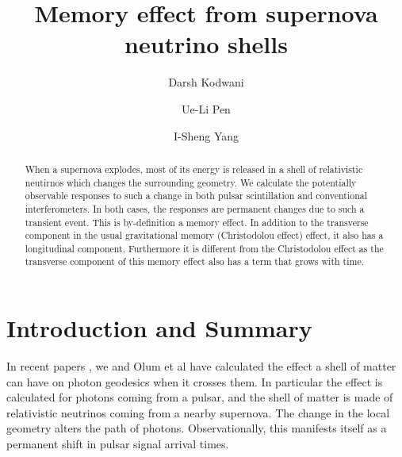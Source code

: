 \documentclass[aps,showpacs,onecolumn,floats,prd,superscriptaddress,nofootinbib]{revtex4-1}
\begin{document}
\title{Memory effect from supernova neutrino shells}

\author{Darsh Kodwani}

\author{Ue-Li Pen}

\author{I-Sheng Yang}

\begin{abstract}
When a supernova explodes, most of its energy is released in a shell of relativistic neutirnos which changes the surrounding geometry.
We calculate the potentially observable responses to such a change in both pulsar scintillation and conventional interferometers.
In both cases, the responses are permanent changes due to such a transient event.
This is by-definition a memory effect.
In addition to the transverse component in the usual gravitational memory (Christodolou effect) effect, it also has a longitudinal component. 
Furthermore it is different from the Christodolou effect as the transverse component of this memory effect also has a term that grows with time. 
\end{abstract}

\maketitle

\section{Introduction and Summary}

In recent papers \cite{Olum:2013gza, PhysRevD.93.103006}, we and Olum et al have calculated the effect a shell of matter can have on photon geodesics when it crosses them. 
In particular the effect is calculated for photons coming from a pulsar, and the shell of matter is made of relativistic neutrinos coming from a nearby supernova.
The change in the local geometry alters the path of photons.
Observationally, this manifests itself as a permanent shift in pulsar signal arrival times. 
\end{document}
